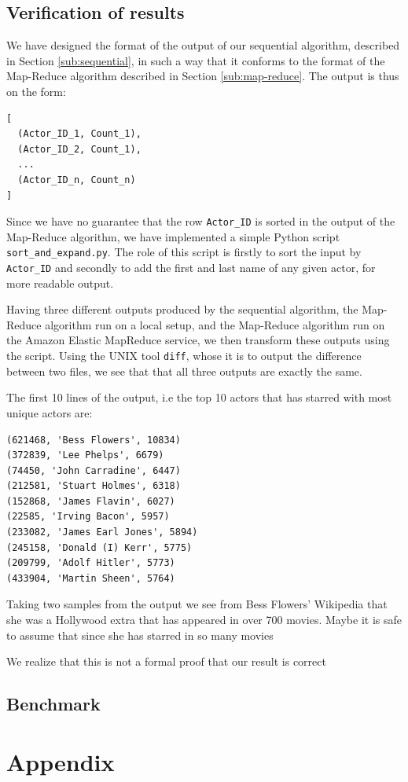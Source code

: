 \documentclass[a4paper,11pt]{article}
\begin{document}
\subsection{Verification of results}
We have designed the format of the output of our sequential algorithm, described in Section \ref{sub:sequential}, in such a way that it conforms to the format of the Map-Reduce algorithm described in Section \ref{sub:map-reduce}. 
The output is thus on the form:
\begin{verbatim}
[ 
  (Actor_ID_1, Count_1),
  (Actor_ID_2, Count_1),
  ...
  (Actor_ID_n, Count_n)
]
\end{verbatim}
Since we have no guarantee that the row \texttt{Actor\_ID} is sorted in the output of the Map-Reduce algorithm, we have implemented a simple Python script \texttt{sort\_and\_expand.py}. 
The role of this script is firstly to sort the input by \texttt{Actor\_ID} and secondly to add the first and last name of any given actor, for more readable output.

Having three different outputs produced by the sequential algorithm, the Map-Reduce algorithm run on a local setup, and the Map-Reduce algorithm run on the Amazon Elastic MapReduce service, we then transform these outputs using the script.
Using the UNIX tool \texttt{diff}, whose it is to output the difference between two files, we see that that all three outputs are exactly the same.

The first 10 lines of the output, i.e the top 10 actors that has starred with most unique actors are: 
\begin{verbatim}
(621468, 'Bess Flowers', 10834)
(372839, 'Lee Phelps', 6679)
(74450, 'John Carradine', 6447)
(212581, 'Stuart Holmes', 6318)
(152868, 'James Flavin', 6027)
(22585, 'Irving Bacon', 5957)
(233082, 'James Earl Jones', 5894)
(245158, 'Donald (I) Kerr', 5775)
(209799, 'Adolf Hitler', 5773)
(433904, 'Martin Sheen', 5764)
\end{verbatim}

Taking two samples from the output we see from Bess Flowers' Wikipedia that she was a Hollywood extra that has appeared in over 700 movies. Maybe it is safe to assume that since she has starred in so many movies 

We realize that this is not a formal proof that our result is correct






\subsection{Benchmark}

\section{Appendix}
\end{document}
